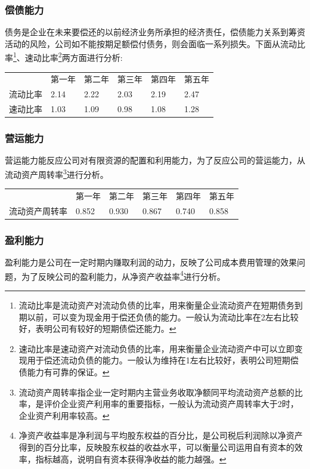 \documentclass[a4paper]{ctexart}
\begin{document}
\subsubsection{偿债能力}
债务是企业在未来要偿还的以前经济业务所承担的经济责任，偿债能力关系到筹资活动的风险，公司如不能按期足额偿付债务，则会面临一系列损失。下面从流动比率\footnote{流动比率是流动资产对流动负债的比率，用来衡量企业流动资产在短期债务到期以前，可以变为现金用于偿还负债的能力。一般认为流动比率在2左右比较好，表明公司有较好的短期债偿还能力。}、速动比率\footnote{速动比率是速动资产对流动负债的比率，用来衡量企业流动资产中可以立即变现用于偿还流动负债的能力。一般认为维持在1左右比较好，表明公司短期偿债能力有可靠的保证。}两方面进行分析:

\newpage
\begin{table}[]\centering
  \begin{tabular}{llllll}
       & 第一年 & 第二年 & 第三年 & 第四年 & 第五年 \\
  流动比率 & 2.14 & 2.22 & 2.03 & 2.19 & 2.47 \\
  速动比率 & 1.03 & 1.09 & 0.98 & 1.08 & 1.28
  \end{tabular}
  \end{table}

  \subsubsection{营运能力}
  营运能力能反应公司对有限资源的配置和利用能力，为了反应公司的营运能力，从流动资产周转率\footnote{流动资产周转率指企业一定时期内主营业务收取净额同平均流动资产总额的比率，是评价企业资产利用率的重要指标，一般认为流动资产周转率大于2时，企业资产利用率较高。}进行分析。

  \newpage
  \begin{table}[]\centering
    \begin{tabular}{llllll}
            & 第一年  & 第二年  & 第三年  & 第四年  & 第五年  \\
    流动资产周转率 & 0.852 & 0.930 & 0.867 & 0.740 & 0.858
    \end{tabular}
    \end{table}

    \subsubsection{盈利能力}
    盈利能力是公司在一定时期内赚取利润的动力，反映了公司成本费用管理的效果问题，为了反映公司的盈利能力，从净资产收益率\footnote{净资产收益率是净利润与平均股东权益的百分比，是公司税后利润除以净资产得到的百分比率，反映股东权益的收益水平，可以衡量公司运用自有资本的效率，指标越高，说明自有资本获得净收益的能力越强。}进行分析。
    
\end{document}

